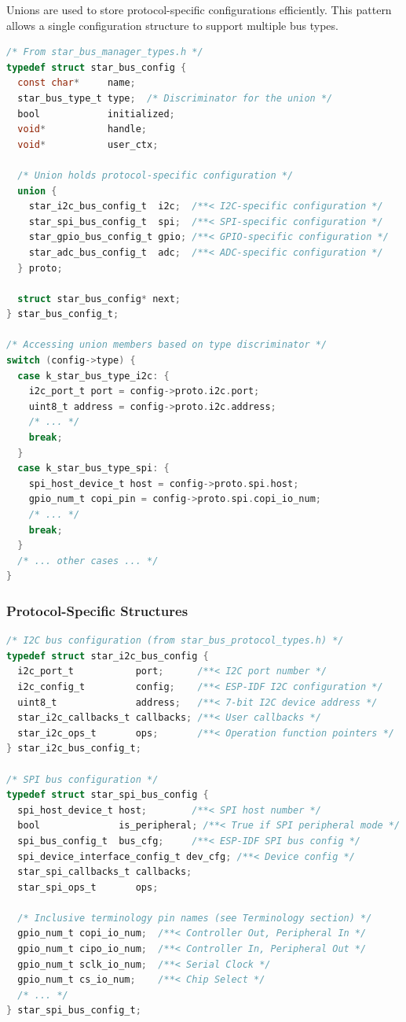 Unions are used to store protocol-specific configurations efficiently. This pattern allows a single configuration structure to support multiple bus types.

\begin{lstlisting}[language=C]
/* From star_bus_manager_types.h */
typedef struct star_bus_config {
  const char*     name;
  star_bus_type_t type;  /* Discriminator for the union */
  bool            initialized;
  void*           handle;
  void*           user_ctx;
  
  /* Union holds protocol-specific configuration */
  union {
    star_i2c_bus_config_t  i2c;  /**< I2C-specific configuration */
    star_spi_bus_config_t  spi;  /**< SPI-specific configuration */
    star_gpio_bus_config_t gpio; /**< GPIO-specific configuration */
    star_adc_bus_config_t  adc;  /**< ADC-specific configuration */
  } proto;
  
  struct star_bus_config* next;
} star_bus_config_t;

/* Accessing union members based on type discriminator */
switch (config->type) {
  case k_star_bus_type_i2c: {
    i2c_port_t port = config->proto.i2c.port;
    uint8_t address = config->proto.i2c.address;
    /* ... */
    break;
  }
  case k_star_bus_type_spi: {
    spi_host_device_t host = config->proto.spi.host;
    gpio_num_t copi_pin = config->proto.spi.copi_io_num;
    /* ... */
    break;
  }
  /* ... other cases ... */
}
\end{lstlisting}

\subsubsection{Protocol-Specific Structures}

\begin{lstlisting}[language=C]
/* I2C bus configuration (from star_bus_protocol_types.h) */
typedef struct star_i2c_bus_config {
  i2c_port_t           port;      /**< I2C port number */
  i2c_config_t         config;    /**< ESP-IDF I2C configuration */
  uint8_t              address;   /**< 7-bit I2C device address */
  star_i2c_callbacks_t callbacks; /**< User callbacks */
  star_i2c_ops_t       ops;       /**< Operation function pointers */
} star_i2c_bus_config_t;

/* SPI bus configuration */
typedef struct star_spi_bus_config {
  spi_host_device_t host;        /**< SPI host number */
  bool              is_peripheral; /**< True if SPI peripheral mode */
  spi_bus_config_t  bus_cfg;     /**< ESP-IDF SPI bus config */
  spi_device_interface_config_t dev_cfg; /**< Device config */
  star_spi_callbacks_t callbacks;
  star_spi_ops_t       ops;
  
  /* Inclusive terminology pin names (see Terminology section) */
  gpio_num_t copi_io_num;  /**< Controller Out, Peripheral In */
  gpio_num_t cipo_io_num;  /**< Controller In, Peripheral Out */
  gpio_num_t sclk_io_num;  /**< Serial Clock */
  gpio_num_t cs_io_num;    /**< Chip Select */
  /* ... */
} star_spi_bus_config_t;
\end{lstlisting}

